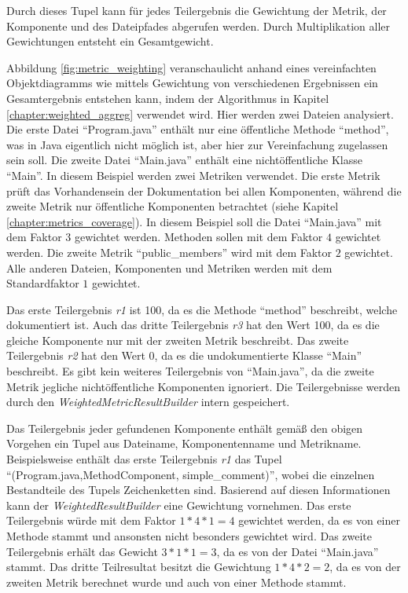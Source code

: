 
Durch dieses Tupel kann für jedes Teilergebnis die Gewichtung der Metrik, der Komponente und des Dateipfades  abgerufen werden. Durch Multiplikation  aller Gewichtungen entsteht ein Gesamtgewicht.

Abbildung \ref{fig:metric_weighting} veranschaulicht anhand eines vereinfachten Objektdiagramms wie mittels Gewichtung von verschiedenen Ergebnissen ein Gesamtergebnis entstehen kann, indem der Algorithmus in Kapitel \ref{chapter:weighted_aggreg} verwendet wird. Hier werden zwei Dateien analysiert. Die erste Datei \enquote{Program.java} enthält nur eine öffentliche Methode \enquote{method}, was in Java eigentlich nicht möglich ist, aber hier zur Vereinfachung zugelassen sein soll. Die zweite Datei \enquote{Main.java} enthält eine nichtöffentliche Klasse \enquote{Main}. In diesem Beispiel werden zwei Metriken verwendet. Die erste Metrik prüft das Vorhandensein der Dokumentation bei allen Komponenten, während die zweite Metrik nur öffentliche Komponenten betrachtet (siehe Kapitel \ref{chapter:metrics_coverage}). In diesem Beispiel soll die Datei \enquote{Main.java} mit dem Faktor $3$ gewichtet werden. Methoden sollen mit dem Faktor $4$ gewichtet werden. Die zweite Metrik \enquote{public\_members} wird mit dem Faktor $2$ gewichtet. Alle anderen Dateien, Komponenten und Metriken werden mit dem Standardfaktor $1$ gewichtet.

Das erste Teilergebnis \textit{r1} ist 100, da es die  Methode \enquote{method} beschreibt, welche dokumentiert ist. Auch das dritte Teilergebnis \textit{r3} hat den Wert 100, da es die gleiche Komponente nur mit der zweiten Metrik beschreibt. Das zweite Teilergebnis \textit{r2} hat den Wert 0, da es die undokumentierte Klasse \enquote{Main} beschreibt.  Es gibt kein weiteres Teilergebnis von \enquote{Main.java}, da die zweite Metrik jegliche nichtöffentliche Komponenten ignoriert. Die Teilergebnisse werden durch den \textit{WeightedMetricResultBuilder} intern gespeichert. 

Das Teilergebnis jeder gefundenen Komponente enthält gemäß den obigen Vorgehen ein Tupel aus Dateiname, Komponentenname und Metrikname. Beispielsweise enthält das erste  Teilergebnis \textit{r1} das Tupel \enquote{(Program.java,MethodComponent, simple\_comment)}, wobei die einzelnen Bestandteile des Tupels Zeichenketten sind. Basierend auf diesen Informationen kann der \textit{WeightedResultBuilder} eine Gewichtung vornehmen. Das erste Teilergebnis würde mit dem Faktor $1*4*1=4$ gewichtet werden, da es von einer Methode stammt  und ansonsten nicht besonders gewichtet wird. Das zweite Teilergebnis erhält das Gewicht $3*1*1=3$, da es von der Datei \enquote{Main.java} stammt. Das dritte Teilresultat besitzt die Gewichtung $1*4*2=2$, da es von der zweiten Metrik berechnet wurde und auch von einer Methode stammt. 

